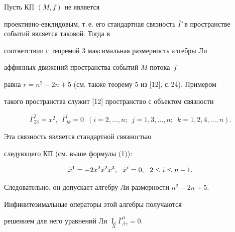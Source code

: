 \begin{pf}


Пусть КП $(M,f) $ не является


проективно-евклидовым, т.\,е. его стандартная связность $\overline{


\Gamma}$ в пространстве событий является таковой. Тогда в


соответствии с теоремой 3 максимальная размерность алгебры Ли


аффинных движений пространства событий $\overline{M} $ потока~$f$


равна $r=n^2-2n+5$ (см. также теорему 5 из [12], с.\,24). Примером


такого пространства служит [12] пространство с объектом связности


$$


\overline{\Gamma}^1_{23}=x^2,\ \


\overline{\Gamma}^i_{jk}=0\ \; (i=2,\dotsc,n;\ \;


j=1,3,\dotsc,n;\ \; k=1,2,4,\dotsc,n).


$$


Эта связность является стандартной связностью 


следующего КП (см. выше формулы (1)):


$$


\Ddot{x}^1=-2x^2\dot{x}^2\dot{x}^3,\ \ \Ddot{x}^i=0,\ \ 2\leq i\leq n-1.


$$


Следовательно, он допускает алгебру Ли размерности $n^2-2n+5$.


Инфинитезимальные операторы этой алгебры получаются


решением для него уравнений Ли $\mathop{ L}\limits_{X}


\overline{\Gamma}^{\alpha}_{\beta \gamma}=0$.


\end{pf}





